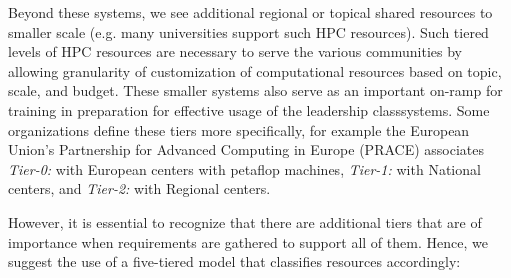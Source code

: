 \documentclass[sigconf]{acmart}
\begin{document}
Beyond these systems, we see additional regional or topical shared resources to smaller scale (e.g. many universities support such HPC resources). Such tiered levels of HPC resources are necessary to serve the various communities by allowing granularity of customization of computational resources based on topic, scale, and budget. These smaller systems also serve as an important on-ramp for training in preparation for effective usage of the leadership classsystems. Some organizations define these tiers more specifically, for example the European Union's Partnership for Advanced Computing in Europe (PRACE) \cite{www-prace,prace-fact} associates {\em Tier-0:} with European centers with petaflop machines, {\em Tier-1:} with National centers, and {\em Tier-2:} with Regional centers.
  
However, it is essential to recognize that there are additional tiers that are of importance when requirements are gathered to support all of them. Hence, we suggest the use of a five-tiered model that classifies resources accordingly:
\end{document}
